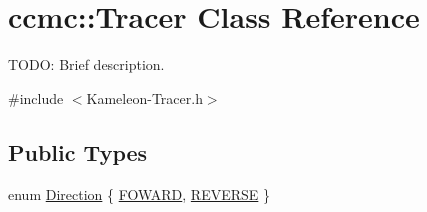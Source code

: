 \hypertarget{classccmc_1_1_tracer}{\section{ccmc\-:\-:Tracer Class Reference}
\label{classccmc_1_1_tracer}
}


T\-O\-D\-O\-: Brief description.  




{\ttfamily \#include $<$Kameleon-\/\-Tracer.\-h$>$}

\subsection*{Public Types}
\begin{DoxyCompactItemize}
\item 
enum \hyperlink{classccmc_1_1_tracer_a2c914b28e2e205cb1a7c01f2941fcae2}{Direction} \{ \hyperlink{classccmc_1_1_tracer_a2c914b28e2e205cb1a7c01f2941fcae2a133381f1178a2affb0f1c79a67b45e52}{F\-O\-W\-A\-R\-D}, 
\hyperlink{classccmc_1_1_tracer_a2c914b28e2e205cb1a7c01f2941fcae2af2f8ce1e1224ce9d334d5260fa8a8526}{R\-E\-V\-E\-R\-S\-E}
 \}
\end{DoxyCompactItemize}
